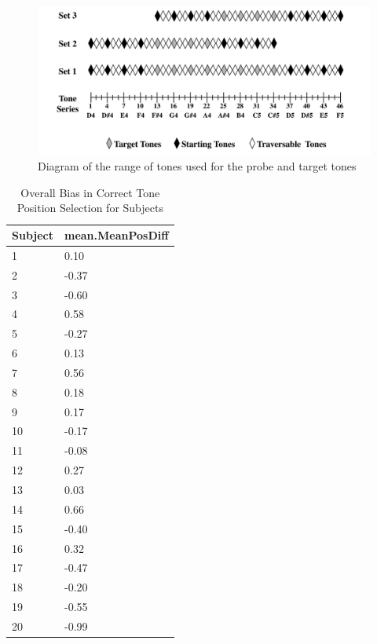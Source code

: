 \documentclass[
  man]{apa6}
\begin{document}
\begin{figure}
\centering
\includegraphics{tones.png}
\caption{\label{fig:fig-tonescale}Diagram of the range of tones used for the probe and target tones}
\end{figure}

\begin{table}[tbp]

\begin{center}
\begin{threeparttable}

\caption{\label{tab:table-MeanPosDiff}Overall Bias in Correct Tone Position Selection for Subjects}

\begin{tabular}{ll}
\toprule
Subject & \multicolumn{1}{c}{mean.MeanPosDiff}\\
\midrule
1 & 0.10\\
2 & -0.37\\
3 & -0.60\\
4 & 0.58\\
5 & -0.27\\
6 & 0.13\\
7 & 0.56\\
8 & 0.18\\
9 & 0.17\\
10 & -0.17\\
11 & -0.08\\
12 & 0.27\\
13 & 0.03\\
14 & 0.66\\
15 & -0.40\\
16 & 0.32\\
17 & -0.47\\
18 & -0.20\\
19 & -0.55\\
20 & -0.99\\
\bottomrule
\end{tabular}

\end{threeparttable}
\end{center}

\end{table}
\end{document}
